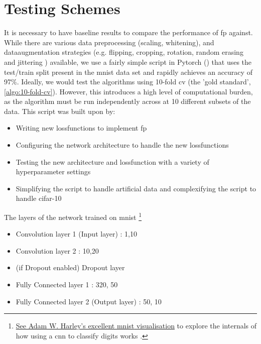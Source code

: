 %

\section{Testing Schemes}
  
It is necessary to have baseline results to compare the performance of \gls{fp} against. While there are various data preprocessing (scaling, whitening), and \gls{dataaugmentation} strategies (e.g. flipping, cropping, rotation, random erasing and jittering \cite{data_aug_survey}) available, we use a fairly simple script in Pytorch (\cite{mnist_script}) that uses the test/train split present in the  \gls{mnist} data set and rapidly achieves an accuracy of 97\%. Ideally, we would test the algorithms using 10-fold \gls{cv} (the 'gold standard', \ref{algo:10-fold-cv}). However, this introduces a high level of computational burden, as the algorithm must be run independently across at 10 different subsets of the data. This script was built upon by:

\begin{itemize}
    \item Writing new \gls{lossfunction}s to implement \gls{fp}
    \item Configuring the network architecture to handle the new \gls{lossfunction}s
    \item Testing the new architecture and \gls{lossfunction} with a variety of \gls{hyperparameter} settings
    \item Simplifying the script to handle artificial data and complexifying the script to handle \gls{cifar}-10
\end{itemize}

The layers of the network trained on \gls{mnist} \footnote{\href{https://www.cs.ryerson.ca/~aharley/vis/conv/}{See Adam W. Harley's excellent \gls{mnist} visualisation} to explore the internals of how using a \gls{cnn} to classify digits works \cite{mnist_viz}.}

\begin{itemize}
    \itemsep-1em 
    \item Convolution layer 1 (Input layer) : 1,10
    \item Convolution layer 2 : 10,20
    \item (if Dropout enabled) Dropout layer 
    \item Fully Connected layer 1 : 320, 50
    \item Fully Connected layer 2 (Output layer) : 50, 10
\end{itemize}

